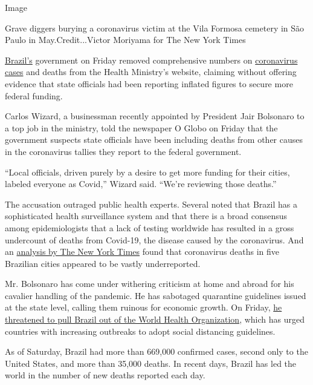Image

Grave diggers burying a coronavirus victim at the Vila Formosa cemetery
in São Paulo in May.Credit...Victor Moriyama for The New York Times

\href{https://www.nytimes3xbfgragh.onion/2020/06/10/world/americas/bolsonaro-coup-coronavirus-brazil.html}{Brazil's}
government on Friday removed comprehensive numbers on
\href{https://www.nytimes3xbfgragh.onion/2020/06/10/world/americas/bolsonaro-coup-coronavirus-brazil.html}{coronavirus
cases} and deaths from the Health Ministry's website, claiming without
offering evidence that state officials had been reporting inflated
figures to secure more federal funding.

Carlos Wizard, a businessman recently appointed by President Jair
Bolsonaro to a top job in the ministry, told the newspaper O Globo on
Friday that the government suspects state officials have been including
deaths from other causes in the coronavirus tallies they report to the
federal government.

``Local officials, driven purely by a desire to get more funding for
their cities, labeled everyone as Covid,'' Wizard said. ``We're
reviewing those deaths.''

The accusation outraged public health experts. Several noted that Brazil
has a sophisticated health surveillance system and that there is a broad
consensus among epidemiologists that a lack of testing worldwide has
resulted in a gross undercount of deaths from Covid-19, the disease
caused by the coronavirus. And an
\href{https://www.nytimes3xbfgragh.onion/interactive/2020/04/21/world/coronavirus-missing-deaths.html}{analysis
by The New York Times} found that coronavirus deaths in five Brazilian
cities appeared to be vastly underreported.

Mr. Bolsonaro has come under withering criticism at home and abroad for
his cavalier handling of the pandemic. He has sabotaged quarantine
guidelines issued at the state level, calling them ruinous for economic
growth. On Friday,
\href{https://www.haaretz.com/world-news/americas/bolsonaro-threatens-who-exit-as-coronavirus-kills-a-brazilian-per-minute-1.8900578}{he
threatened to pull Brazil out of the World Health Organization}, which
has urged countries with increasing outbreaks to adopt social distancing
guidelines.

As of Saturday, Brazil had more than 669,000 confirmed cases, second
only to the United States, and more than 35,000 deaths. In recent days,
Brazil has led the world in the number of new deaths reported each day.

